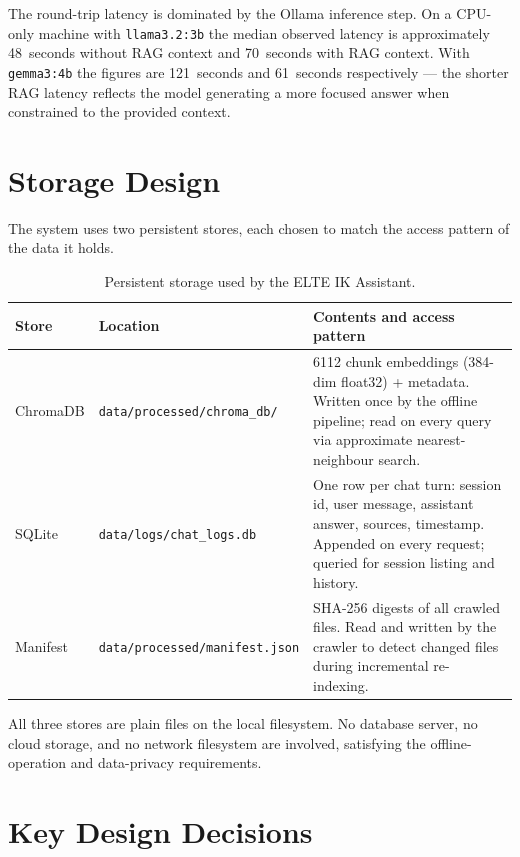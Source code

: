 The round-trip latency is dominated by the Ollama inference step. On a
CPU-only machine with \texttt{llama3.2:3b} the median observed latency is
approximately 48~seconds without RAG context and 70~seconds with RAG context.
With \texttt{gemma3:4b} the figures are 121~seconds and 61~seconds respectively —
the shorter RAG latency reflects the model generating a more focused answer when
constrained to the provided context.

\section{Storage Design}
\label{sec:design-storage}

The system uses two persistent stores, each chosen to match the access pattern of the data it holds.

\begin{table}[H]
    \centering
    \begin{tabular}{|l|l|p{}|}
        \hline
        \textbf{Store} & \textbf{Location} & \textbf{Contents and access pattern} \\
        \hline\hline
        ChromaDB & \texttt{data/processed/chroma\_db/} & 6112 chunk embeddings (384-dim float32) + metadata. Written once by the offline pipeline; read on every query via approximate nearest-neighbour search. \\
        \hline
        SQLite & \texttt{data/logs/chat\_logs.db} & One row per chat turn: session id, user message, assistant answer, sources, timestamp. Appended on every request; queried for session listing and history. \\
        \hline
        Manifest & \texttt{data/processed/manifest.json} & SHA-256 digests of all crawled files. Read and written by the crawler to detect changed files during incremental re-indexing. \\
        \hline
    \end{tabular}
    \caption{Persistent storage used by the ELTE IK Assistant.}
    \label{tab:storage}
\end{table}

All three stores are plain files on the local filesystem. No database server, no cloud storage, and no network filesystem are involved, satisfying the offline-operation and data-privacy requirements.

\section{Key Design Decisions}
\label{sec:design-decisions}

